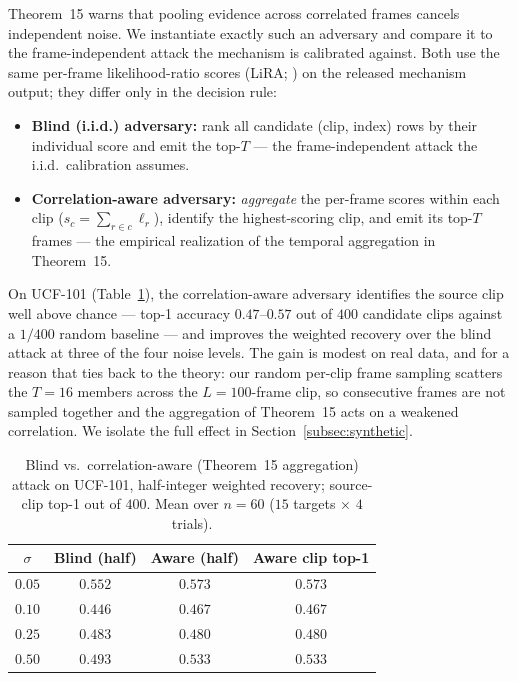 Theorem~15 warns that pooling evidence across correlated frames cancels
independent noise. We instantiate exactly such an adversary and compare it
to the frame-independent attack the mechanism is calibrated against. Both
use the same per-frame likelihood-ratio scores (LiRA;
\citealp{carlini2022firstprinciples}) on the released mechanism output; they
differ only in the decision rule:
\begin{itemize}[leftmargin=*]
\item \textbf{Blind (i.i.d.) adversary:} rank all candidate (clip, index)
rows by their individual score and emit the top-$T$ --- the frame-independent
attack the i.i.d.\ calibration assumes.
\item \textbf{Correlation-aware adversary:} \emph{aggregate} the per-frame
scores within each clip ($s_c=\sum_{r\in c}\ell_r$), identify the
highest-scoring clip, and emit its top-$T$ frames --- the empirical
realization of the temporal aggregation in Theorem~15.
\end{itemize}
On UCF-101 (Table~\ref{tab:aware_real}), the correlation-aware adversary
identifies the source clip well above chance --- top-1 accuracy
$0.47$--$0.57$ out of $400$ candidate clips against a $1/400$ random
baseline --- and improves the weighted recovery over the blind attack at
three of the four noise levels. The gain is modest on real data, and for a
reason that ties back to the theory: our random per-clip frame sampling
scatters the $T=16$ members across the $L=100$-frame clip, so consecutive
frames are not sampled together and the aggregation of Theorem~15 acts on a
weakened correlation. We isolate the full effect in
Section~\ref{subsec:synthetic}.

\begin{table}[t]
\centering\small
\caption{Blind vs.\ correlation-aware (Theorem~15 aggregation) attack on
UCF-101, half-integer weighted recovery; source-clip top-1 out of $400$.
Mean over $n{=}60$ ($15$ targets $\times$ $4$ trials).}
\label{tab:aware_real}
\begin{tabular}{cccc}
\toprule
$\sigma$ & Blind (half) & Aware (half) & Aware clip top-1 \\
\midrule
$0.05$ & $0.552$ & $0.573$ & $0.573$ \\
$0.10$ & $0.446$ & $0.467$ & $0.467$ \\
$0.25$ & $0.483$ & $0.480$ & $0.480$ \\
$0.50$ & $0.493$ & $0.533$ & $0.533$ \\
\bottomrule
\end{tabular}
\end{table}

